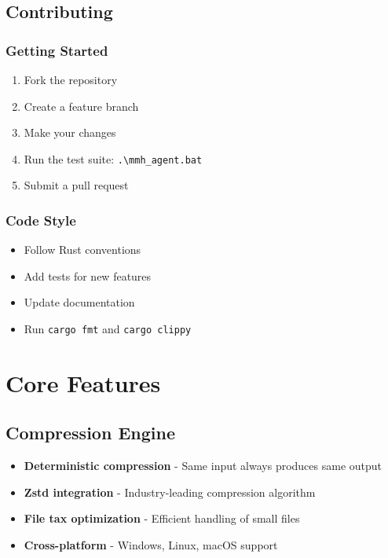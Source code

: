 \documentclass[11pt,a4paper]{article}
\begin{document}
	\subsection{Contributing}

	\subsubsection{Getting Started}
	\begin{enumerate}
		\item Fork the repository
		\item Create a feature branch
		\item Make your changes
		\item Run the test suite: \texttt{.\textbackslash mmh\_agent.bat}
		\item Submit a pull request
	\end{enumerate}

	\subsubsection{Code Style}
	\begin{itemize}
		\item Follow Rust conventions
		\item Add tests for new features
		\item Update documentation
		\item Run \texttt{cargo fmt} and \texttt{cargo clippy}
	\end{itemize}

	\section{Core Features}
	\label{sec:features}

	\subsection{Compression Engine}
	\begin{itemize}
		\item \textbf{Deterministic compression} - Same input always produces same output
		\item \textbf{Zstd integration} - Industry-leading compression algorithm
		\item \textbf{File tax optimization} - Efficient handling of small files
		\item \textbf{Cross-platform} - Windows, Linux, macOS support
	\end{itemize}
\end{document}
